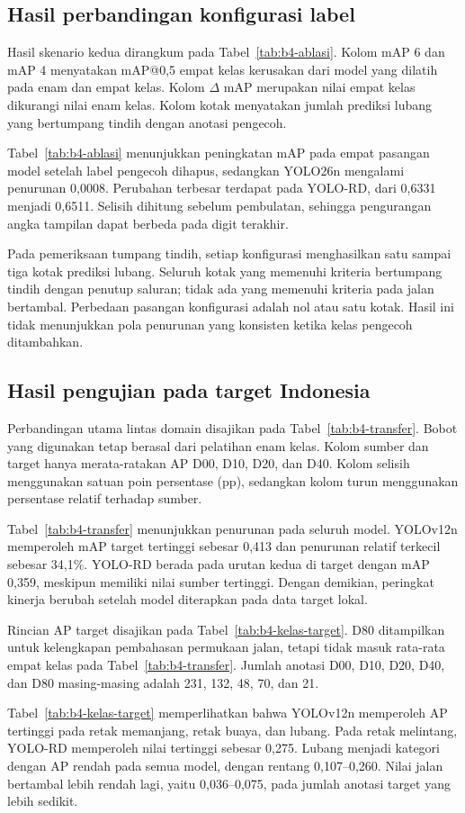 \subsection{Hasil perbandingan konfigurasi label}
Hasil skenario kedua dirangkum pada Tabel~\ref{tab:b4-ablasi}. Kolom mAP 6 dan mAP 4 menyatakan mAP@0,5 empat kelas kerusakan dari model yang dilatih pada enam dan empat kelas. Kolom $\Delta$ mAP merupakan nilai empat kelas dikurangi nilai enam kelas. Kolom kotak menyatakan jumlah prediksi lubang yang bertumpang tindih dengan anotasi pengecoh.

Tabel~\ref{tab:b4-ablasi} menunjukkan peningkatan mAP pada empat pasangan model setelah label pengecoh dihapus, sedangkan YOLO26n mengalami penurunan 0,0008. Perubahan terbesar terdapat pada YOLO-RD, dari 0,6331 menjadi 0,6511. Selisih dihitung sebelum pembulatan, sehingga pengurangan angka tampilan dapat berbeda pada digit terakhir.

Pada pemeriksaan tumpang tindih, setiap konfigurasi menghasilkan satu sampai tiga kotak prediksi lubang. Seluruh kotak yang memenuhi kriteria bertumpang tindih dengan penutup saluran; tidak ada yang memenuhi kriteria pada jalan bertambal. Perbedaan pasangan konfigurasi adalah nol atau satu kotak. Hasil ini tidak menunjukkan pola penurunan yang konsisten ketika kelas pengecoh ditambahkan.

\subsection{Hasil pengujian pada target Indonesia}
\label{subsec:b4-target}
Perbandingan utama lintas domain disajikan pada Tabel~\ref{tab:b4-transfer}. Bobot yang digunakan tetap berasal dari pelatihan enam kelas. Kolom sumber dan target hanya merata-ratakan AP D00, D10, D20, dan D40. Kolom selisih menggunakan satuan poin persentase (pp), sedangkan kolom turun menggunakan persentase relatif terhadap sumber.

Tabel~\ref{tab:b4-transfer} menunjukkan penurunan pada seluruh model. YOLOv12n memperoleh mAP target tertinggi sebesar 0,413 dan penurunan relatif terkecil sebesar 34,1\%. YOLO-RD berada pada urutan kedua di target dengan mAP 0,359, meskipun memiliki nilai sumber tertinggi. Dengan demikian, peringkat kinerja berubah setelah model diterapkan pada data target lokal.

Rincian AP target disajikan pada Tabel~\ref{tab:b4-kelas-target}. D80 ditampilkan untuk kelengkapan pembahasan permukaan jalan, tetapi tidak masuk rata-rata empat kelas pada Tabel~\ref{tab:b4-transfer}. Jumlah anotasi D00, D10, D20, D40, dan D80 masing-masing adalah 231, 132, 48, 70, dan 21.

Tabel~\ref{tab:b4-kelas-target} memperlihatkan bahwa YOLOv12n memperoleh AP tertinggi pada retak memanjang, retak buaya, dan lubang. Pada retak melintang, YOLO-RD memperoleh nilai tertinggi sebesar 0,275. Lubang menjadi kategori dengan AP rendah pada semua model, dengan rentang 0,107--0,260. Nilai jalan bertambal lebih rendah lagi, yaitu 0,036--0,075, pada jumlah anotasi target yang lebih sedikit.

